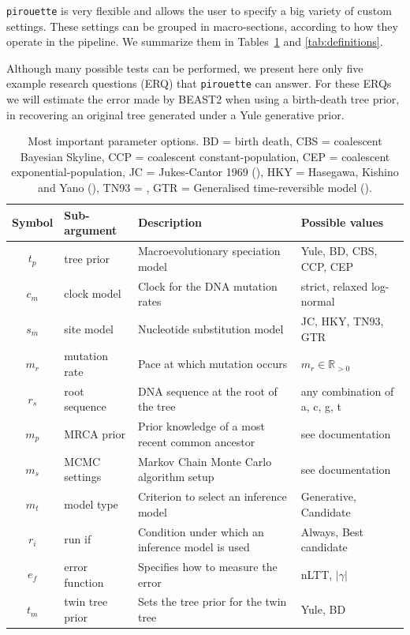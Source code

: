 \documentclass{article}
\begin{document}
\verb;pirouette; is very flexible and allows the user 
to specify a big variety of custom settings. 
These settings can be grouped in macro-sections, 
according to how they operate in the pipeline. 
We summarize them in Tables~\ref{tab:options} and \ref{tab:definitions}.

Although many possible tests can be performed, 
we present here only five example research questions (ERQ) that \verb;pirouette; can answer. 
For these ERQs we will estimate the error made by BEAST2 when 
using a birth-death tree prior, in recovering an original tree 
generated under a Yule generative prior.



\begin{table}
\centering
  \begin{tabular}{|@{}c|p{2.5cm}|p{9cm}|p{4.5cm}@{}|}
    \hline
    \centering
    \textbf{Symbol} & \textbf{Sub-argument} & \textbf{Description} & \textbf{Possible values} \\ 
    \hline
    $\mathit{t_{p}}$ & tree prior & Macroevolutionary speciation model & Yule, BD, CBS, CCP, CEP \\
    $\mathit{c_{m}}$ & clock model & Clock for the DNA mutation rates & strict, relaxed log-normal \\
    $\mathit{s_{m}}$ & site model & Nucleotide substitution model & JC, HKY, TN93, GTR \\
    $\mathit{m_{r}}$ & mutation rate & Pace at which mutation occurs & $m_{r} \in \mathbb{R}_{>0}$\\
    $\mathit{r_{s}}$ & root sequence & DNA sequence at the root of the tree & any combination of a, c, g, t \\
    $\mathit{m_{p}}$ & MRCA prior & Prior knowledge of a most recent common ancestor & see documentation \\
    $\mathit{m_{s}}$ & MCMC settings & Markov Chain Monte Carlo algorithm setup & see documentation \\
    $\mathit{m_{t}}$ & model type & Criterion to select an inference model & Generative, Candidate \\
    $\mathit{r_{i}}$ & run if & Condition under which an inference model is used & Always, Best candidate\\
    $\mathit{e_{f}}$ & error function & Specifies how to measure the error & nLTT, $|\gamma|$ \\
    $\mathit{t_{m}}$ & twin tree prior & Sets the tree prior for the twin tree & Yule, BD \\
    \hline
  \end{tabular}
  \caption{
    Most important parameter options. BD = birth death, CBS = coalescent
    Bayesian Skyline, CCP = coalescent constant-population, CEP = coalescent
    exponential-population, JC = Jukes-Cantor 1969 (\cite{jukes1969evolution}), HKY = Hasegawa, Kishino and 
    Yano (\cite{hasegawa1985dating}), TN93 = \cite{tamura1993estimation}, GTR = Generalised time-reversible 
    model (\cite{tavare1986some}).
  }
  \label{tab:options}
\bigskip


\end{table}
\end{document}
